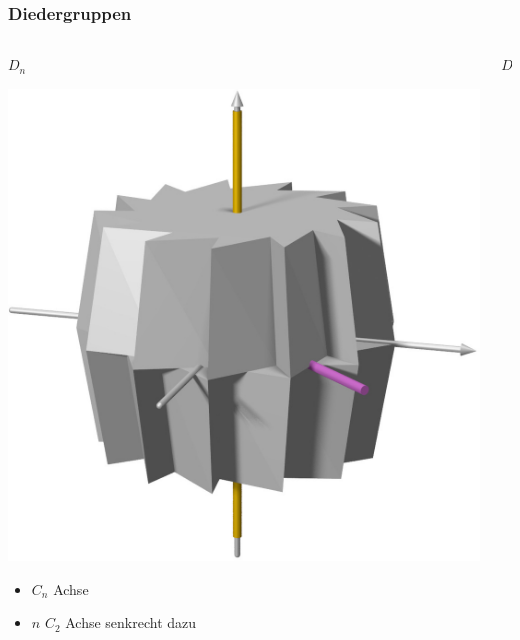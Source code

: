 %
%
%
\bgroup
\begin{frame}[t]
\setlength{\abovedisplayskip}{5pt}
\setlength{\belowdisplayskip}{5pt}
\frametitle{Diedergruppen}
\vspace{-20pt}
\begin{columns}[t,onlytextwidth]
\begin{column}{0.33\textwidth}
\begin{block}{$D_n$}
\begin{center}
\includegraphics[width=\textwidth]{../slides/6/punktgruppen/images/dn.jpg}
\end{center}
\begin{itemize}
\item $C_n$ Achse
\item $n$ $C_2$ Achse senkrecht dazu
\end{itemize}
\end{block}
\end{column}
\begin{column}{0.33\textwidth}
\begin{block}{$D_{nd}$}
\begin{center}

\end{center}
\end{block}
\end{column}
\end{columns}
\end{frame}
